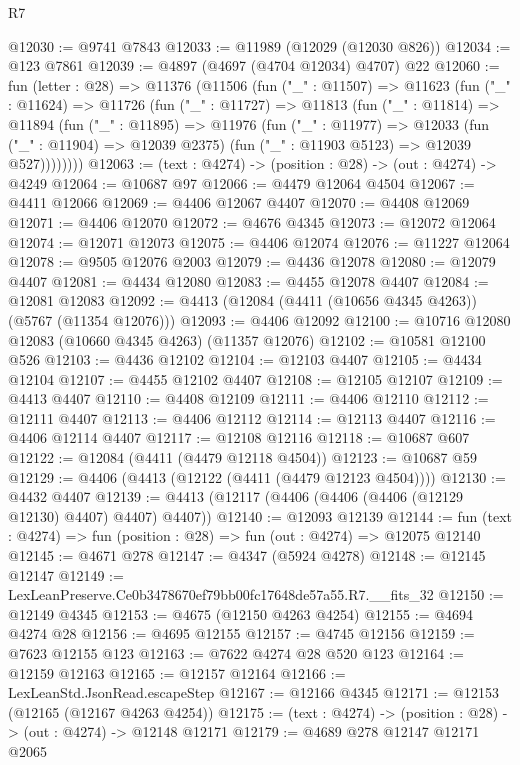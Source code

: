 \begin{lexlean}{R7}
\begin{coremodule}
@12030 := @9741 @7843
@12033 := @11989 (@12029 (@12030 @826))
@12034 := @123 @7861
@12039 := @4897 (@4697 (@4704 @12034) @4707) @22
@12060 := fun (letter : @28) =>
  @11376
    (@11506
      (fun ("_" : @11507) =>
      @11623
        (fun ("_" : @11624) =>
        @11726
          (fun ("_" : @11727) =>
          @11813
            (fun ("_" : @11814) =>
            @11894
              (fun ("_" : @11895) =>
              @11976
                (fun ("_" : @11977) =>
                @12033
                  (fun ("_" : @11904) => @12039 @2375)
                  (fun ("_" : @11903 @5123) => @12039 @527))))))))
@12063 := (text : @4274) -> (position : @28) -> (out : @4274) -> @4249
@12064 := @10687 @97
@12066 := @4479 @12064 @4504
@12067 := @4411 @12066
@12069 := @4406 @12067 @4407
@12070 := @4408 @12069
@12071 := @4406 @12070
@12072 := @4676 @4345
@12073 := @12072 @12064
@12074 := @12071 @12073
@12075 := @4406 @12074
@12076 := @11227 @12064
@12078 := @9505 @12076 @2003
@12079 := @4436 @12078
@12080 := @12079 @4407
@12081 := @4434 @12080
@12083 := @4455 @12078 @4407
@12084 := @12081 @12083
@12092 := @4413 (@12084 (@4411 (@10656 @4345 @4263)) (@5767 (@11354 @12076)))
@12093 := @4406 @12092
@12100 := @10716 @12080 @12083 (@10660 @4345 @4263) (@11357 @12076)
@12102 := @10581 @12100 @526
@12103 := @4436 @12102
@12104 := @12103 @4407
@12105 := @4434 @12104
@12107 := @4455 @12102 @4407
@12108 := @12105 @12107
@12109 := @4413 @4407
@12110 := @4408 @12109
@12111 := @4406 @12110
@12112 := @12111 @4407
@12113 := @4406 @12112
@12114 := @12113 @4407
@12116 := @4406 @12114 @4407
@12117 := @12108 @12116
@12118 := @10687 @607
@12122 := @12084 (@4411 (@4479 @12118 @4504))
@12123 := @10687 @59
@12129 := @4406 (@4413 (@12122 (@4411 (@4479 @12123 @4504))))
@12130 := @4432 @4407
@12139 := @4413 (@12117 (@4406 (@4406 (@4406 (@12129 @12130) @4407) @4407) @4407))
@12140 := @12093 @12139
@12144 := fun (text : @4274) => fun (position : @28) => fun (out : @4274) => @12075 @12140
@12145 := @4671 @278
@12147 := @4347 (@5924 @4278)
@12148 := @12145 @12147
@12149 := LexLeanPreserve.Ce0b3478670ef79bb00fc17648de57a55.R7.__fits_32
@12150 := @12149 @4345
@12153 := @4675 (@12150 @4263 @4254)
@12155 := @4694 @4274 @28
@12156 := @4695 @12155
@12157 := @4745 @12156
@12159 := @7623 @12155 @123
@12163 := @7622 @4274 @28 @520 @123
@12164 := @12159 @12163
@12165 := @12157 @12164
@12166 := LexLeanStd.JsonRead.escapeStep
@12167 := @12166 @4345
@12171 := @12153 (@12165 (@12167 @4263 @4254))
@12175 := (text : @4274) -> (position : @28) -> (out : @4274) -> @12148 @12171
@12179 := @4689 @278 @12147 @12171 @2065

\end{coremodule}
\end{lexlean}
